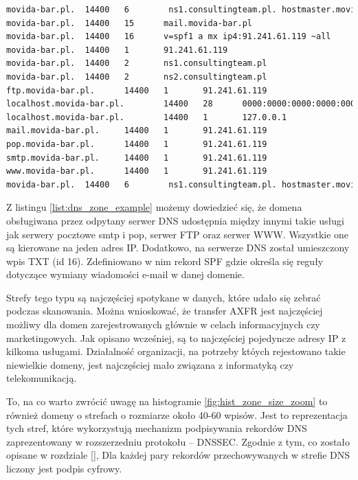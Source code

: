 \begin{lstlisting}[label={list:dns_zone_example},captionpos=b,caption=Przykładowy plik strefy DNS.,language=bash]
movida-bar.pl.  14400   6        ns1.consultingteam.pl. hostmaster.movida-bar.pl. 1952801133 3222735464 1869837421 1634956389 1925188727
movida-bar.pl.  14400   15      mail.movida-bar.pl
movida-bar.pl.  14400   16      v=spf1 a mx ip4:91.241.61.119 ~all
movida-bar.pl.  14400   1       91.241.61.119
movida-bar.pl.  14400   2       ns1.consultingteam.pl
movida-bar.pl.  14400   2       ns2.consultingteam.pl
ftp.movida-bar.pl.      14400   1       91.241.61.119
localhost.movida-bar.pl.        14400   28      0000:0000:0000:0000:0000:0000:0000:0001
localhost.movida-bar.pl.        14400   1       127.0.0.1
mail.movida-bar.pl.     14400   1       91.241.61.119
pop.movida-bar.pl.      14400   1       91.241.61.119
smtp.movida-bar.pl.     14400   1       91.241.61.119
www.movida-bar.pl.      14400   1       91.241.61.119
movida-bar.pl.  14400   6        ns1.consultingteam.pl. hostmaster.movida-bar.pl. 2013010900 14400 3600 1209600 86400
\end{lstlisting}

Z listingu \ref{list:dns_zone_example} możemy dowiedzieć się, że domena obsługiwana przez odpytany serwer DNS udostępnia między innymi takie usługi jak serwery pocztowe smtp i pop, serwer FTP oraz serwer WWW. Wszystkie one są kierowane na jeden adres IP. Dodatkowo, na serwerze DNS został umieszczony wpis TXT (id 16). Zdefiniowano w nim rekord SPF gdzie określa się reguły dotyczące wymiany wiadomości e-mail w danej domenie. 

Strefy tego typu są najczęściej spotykane w danych, które udało się zebrać podczas skanowania. Można wnioskować, że transfer AXFR jest najczęściej możliwy dla domen zarejestrowanych głównie w celach informacyjnych czy marketingowych. Jak opisano wcześniej, są to najczęściej pojedyncze adresy IP z kilkoma usługami. Działalność organizacji, na potrzeby któych rejestowano takie niewielkie domeny, jest najczęściej mało związana z informatyką czy telekomunikacją. 

To, na co warto zwrócić uwagę na histogramie \ref{fig:hist_zone_size_zoom} to również domeny o strefach o rozmiarze około 40-60 wpisów. Jest to reprezentacja tych stref, które wykorzystują mechanizm podpisywania rekordów DNS zaprezentowany w rozszerzedniu protokołu -- DNSSEC\cite{RFC4034, RFC4035}. Zgodnie z tym, co zostało opisane w rozdziale \ref{}, Dla każdej pary rekordów przechowywanych w strefie DNS liczony jest podpis cyfrowy. 


